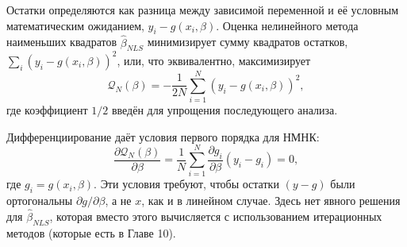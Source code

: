 Остатки определяются как разница между зависимой переменной и её условным математическим ожиданием, $y_i-g(x_i,\beta)$. Оценка нелинейного метода наименьших квадратов $\hat{\beta}_{NLS}$ минимизирует сумму квадратов остатков, $\sum_i (y_i-g(x_i,\beta))^{2}$, или, что эквивалентно, максимизирует
\begin{equation}
\mathcal{Q}_{N}(\beta)= - \frac{1}{2N} \sum_{i=1}^{N} (y_i-g(x_i,\beta))^{2},
\end{equation}
где коэффициент $1/2$ введён для упрощения последующего анализа.

Дифференциирование даёт условия первого порядка для НМНК:
\begin{equation}
\frac {\partial \mathcal{Q}_{N}(\beta)} {\partial \beta}= \frac{1}{N} \sum_{i=1}^{N} \frac{\partial g_i}{\partial \beta}(y_i-g_i)=0,
\end{equation}
где $g_i=g(x_i,\beta)$. Эти условия требуют, чтобы остатки $(y-g)$ были ортогональны $\partial g/ \partial \beta$, а не $x$, как и в линейном случае. Здесь нет явного решения для $\hat{\beta}_{NLS}$, которая вместо этого вычисляется с использованием итерационных методов (которые есть в Главе 10).

